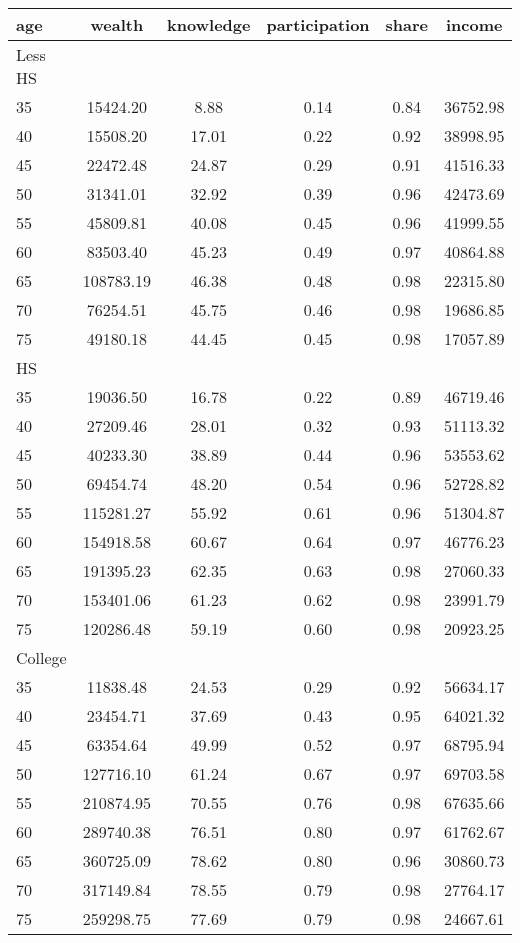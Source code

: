  \begin{tabular}{lccccc}
 \hline \hline
  age & wealth & knowledge & participation & share & income \\
 \hline
 Less HS & & & & & \\
 \hline
35 &  15424.20 &      8.88 &      0.14 &      0.84 &  36752.98 \\ 
40 &  15508.20 &     17.01 &      0.22 &      0.92 &  38998.95 \\ 
45 &  22472.48 &     24.87 &      0.29 &      0.91 &  41516.33 \\ 
50 &  31341.01 &     32.92 &      0.39 &      0.96 &  42473.69 \\ 
55 &  45809.81 &     40.08 &      0.45 &      0.96 &  41999.55 \\ 
60 &  83503.40 &     45.23 &      0.49 &      0.97 &  40864.88 \\ 
65 & 108783.19 &     46.38 &      0.48 &      0.98 &  22315.80 \\ 
70 &  76254.51 &     45.75 &      0.46 &      0.98 &  19686.85 \\ 
75 &  49180.18 &     44.45 &      0.45 &      0.98 &  17057.89 \\ 
 \hline
 HS & & & & & \\
 \hline
35 &  19036.50 &     16.78 &      0.22 &      0.89 &  46719.46 \\ 
40 &  27209.46 &     28.01 &      0.32 &      0.93 &  51113.32 \\ 
45 &  40233.30 &     38.89 &      0.44 &      0.96 &  53553.62 \\ 
50 &  69454.74 &     48.20 &      0.54 &      0.96 &  52728.82 \\ 
55 & 115281.27 &     55.92 &      0.61 &      0.96 &  51304.87 \\ 
60 & 154918.58 &     60.67 &      0.64 &      0.97 &  46776.23 \\ 
65 & 191395.23 &     62.35 &      0.63 &      0.98 &  27060.33 \\ 
70 & 153401.06 &     61.23 &      0.62 &      0.98 &  23991.79 \\ 
75 & 120286.48 &     59.19 &      0.60 &      0.98 &  20923.25 \\ 
 \hline
 College & & & & & \\
 \hline
35 &  11838.48 &     24.53 &      0.29 &      0.92 &  56634.17 \\ 
40 &  23454.71 &     37.69 &      0.43 &      0.95 &  64021.32 \\ 
45 &  63354.64 &     49.99 &      0.52 &      0.97 &  68795.94 \\ 
50 & 127716.10 &     61.24 &      0.67 &      0.97 &  69703.58 \\ 
55 & 210874.95 &     70.55 &      0.76 &      0.98 &  67635.66 \\ 
60 & 289740.38 &     76.51 &      0.80 &      0.97 &  61762.67 \\ 
65 & 360725.09 &     78.62 &      0.80 &      0.96 &  30860.73 \\ 
70 & 317149.84 &     78.55 &      0.79 &      0.98 &  27764.17 \\ 
75 & 259298.75 &     77.69 &      0.79 &      0.98 &  24667.61 \\ 
 \hline \hline
 \end{tabular}
